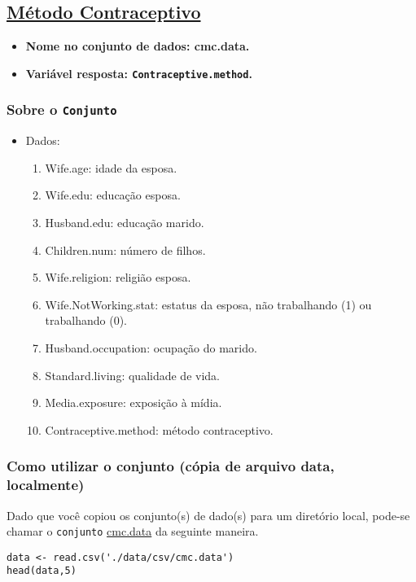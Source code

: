 \documentclass[11pt]{article}
\begin{document}
\subsection{\href{https://archive.ics.uci.edu/ml/datasets/Contraceptive+Method+Choice}{Método Contraceptivo}}
\label{sec:org6ee49b1}
\begin{itemize}
\item \textbf{Nome no conjunto de dados: \textbf{cmc.data}.}
\item \textbf{Variável resposta:  \texttt{Contraceptive.method}.}
\end{itemize}
\subsubsection{Sobre o \texttt{Conjunto}}
\label{sec:org6740706}
\begin{itemize}
\item Dados:
\begin{enumerate}
\item Wife.age: idade da esposa.
\item Wife.edu: educação esposa.
\item Husband.edu: educação marido.
\item Children.num: número de filhos.
\item Wife.religion: religião esposa.
\item Wife.NotWorking.stat: estatus da esposa, não trabalhando (1) ou trabalhando (0).
\item Husband.occupation: ocupação do marido.
\item Standard.living: qualidade de vida.
\item Media.exposure: exposição à mídia.
\item Contraceptive.method: método contraceptivo.
\end{enumerate}
\end{itemize}

\subsubsection{Como utilizar o conjunto (cópia de arquivo data, localmente)}
\label{sec:orgaa4147b}

Dado que você copiou os conjunto(s) de dado(s) para um diretório
local, pode-se chamar o \texttt{conjunto} \href{https://drive.google.com/file/d/1M774v2s0uxQorn7w-ASPOfpPoAb93I2m/view?usp=sharing}{cmc.data} da seguinte maneira.

\begin{verbatim}
data <- read.csv('./data/csv/cmc.data')
head(data,5)
\end{verbatim}
\end{document}
